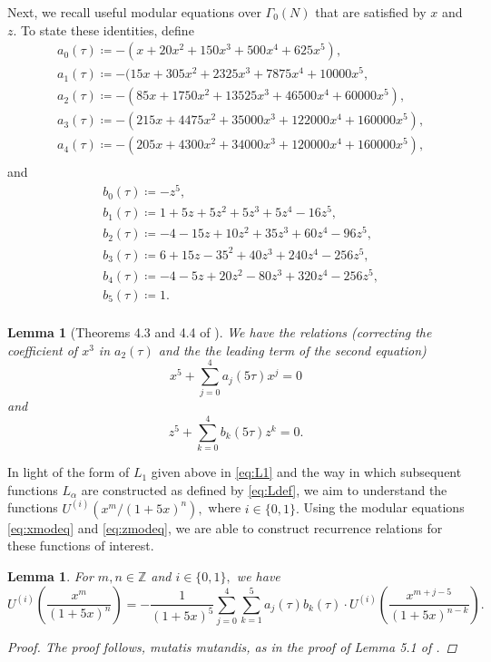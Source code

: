 \documentclass[12pt, reqno]{amsart}
\newtheorem{lem}[thm]{Lemma}
\theoremstyle{definition}
\theoremstyle{remark}
\newcommand{\ZZ}{\mathbb{Z}}
\begin{document}
Next, we recall useful modular equations over $\Gamma_0(N)$ that are satisfied by $x$ and $z.$ To state these identities, define 
\begin{align*}
&a_0(\tau) \coloneqq -(x+20x^2+150x^3+500x^4+625x^5), \\
&a_1(\tau) \coloneqq -(15x+305x^2+2325x^3+7875x^4+10000x^5,\\
&a_2(\tau) \coloneqq  -(85x+1750x^2+13525x^3+46500x^4+60000x^5),\\
&a_3(\tau) \coloneqq -(215x+4475x^2+35000x^3+122000x^4+160000x^5), \\
&a_4(\tau) \coloneqq -(205x+4300x^2+34000x^3+120000x^4+160000x^5),\\
\end{align*}
and 
\begin{align*}
&b_0(\tau) \coloneqq -z^5, \\
&b_1(\tau) \coloneqq 1+5z+5z^2+5z^3+5z^4-16z^5, \\
&b_2(\tau) \coloneqq -4-15z+10z^2+35z^3+60z^4-96z^5, \\
&b_3(\tau) \coloneqq 6+15z-35^2+40z^3+240z^4-256z^5, \\
&b_4(\tau) \coloneqq -4-5z+20z^2-80z^3+320z^4-256z^5, \\
&b_5(\tau) \coloneqq 1. \\
\end{align*}

\begin{lem}[Theorems 4.3 and 4.4 of \cite{BS}]\label{lem:mod_eq} We have the relations (correcting the coefficient of $x^3$ in $a_2(\tau)$ and the the leading term of the second equation)
\begin{equation}\label{eq:xmodeq}
x^5+\sum\limits_{j=0}^4 a_j(5\tau)x^j = 0
\end{equation}
and 
\begin{equation}\label{eq:zmodeq}
z^5+\sum\limits_{k=0}^4 b_k(5\tau) z^k = 0.
\end{equation}
\end{lem}

In light of the form of $L_1$ given above in \eqref{eq:L1} and the way in which subsequent functions $L_\alpha$ are constructed as defined by \eqref{eq:Ldef}, we aim to understand the functions $U^{(i)}(x^m/ (1+5x)^n),$ where $i \in \{0,1\}.$ 
Using the modular equations \eqref{eq:xmodeq} and \eqref{eq:zmodeq}, we are able to construct recurrence relations for these functions of interest.

\begin{lem}\label{lem:recurrence}
For $m, n \in \ZZ$ and $i \in \{0,1\},$ we have 
\[U^{(i)}\left(\frac{x^m}{ (1+5x)^n}\right) = - \frac{1}{(1+5x)^5} \sum\limits_{j=0}^4 \sum\limits_{k=1}^5 a_j(\tau)b_k(\tau) \cdot U^{(i)}\left(\frac{x^{m+j-5}}{(1+5x)^{n-k}}\right).\]
\begin{proof}
The proof follows, mutatis mutandis, as in the proof of Lemma 5.1 of \cite{BS}. 
\end{proof}
\end{lem}
\end{document}
